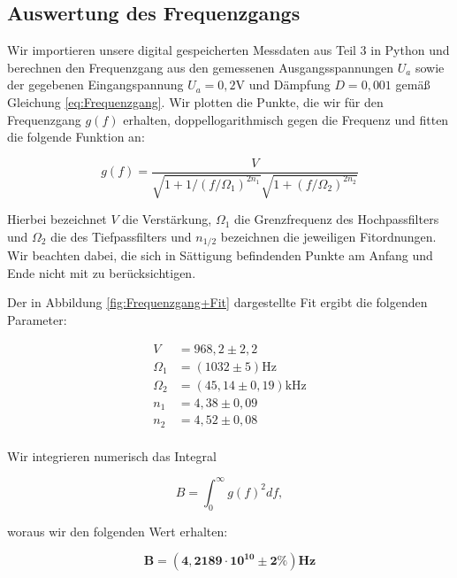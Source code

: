 \documentclass{article}
\begin{document}
\subsection{Auswertung des Frequenzgangs}

Wir importieren unsere digital gespeicherten Messdaten aus Teil 3 in Python und berechnen den Frequenzgang aus den gemessenen Ausgangsspannungen $U_a$ sowie der gegebenen Eingangspannung $U_a = 0,2$V und Dämpfung $D= 0,001$ gemäß Gleichung \ref{eq:Frequenzgang}. Wir plotten die Punkte, die wir für den Frequenzgang $g(f)$ erhalten, doppellogarithmisch gegen die Frequenz und fitten die folgende Funktion an:

\begin{equation}
    g(f) = \frac{V}{\sqrt{1 + 1 /(f / \Omega_1)^{2n_1}} \sqrt{1 + (f/ \Omega_2)^{2n_2}}}
\end{equation}

Hierbei bezeichnet $V$ die Verstärkung, $\Omega_{1}$ die Grenzfrequenz des Hochpassfilters und $\Omega_2$ die des Tiefpassfilters und $n_{1/2}$ bezeichnen die jeweiligen Fitordnungen. Wir beachten dabei, die sich in Sättigung befindenden Punkte am Anfang und Ende nicht mit zu berücksichtigen.

Der in Abbildung \ref{fig:Frequenzgang+Fit} dargestellte Fit ergibt die folgenden Parameter:

\begin{equation}
    \begin{split}
        V &= 968,2 \pm 2,2 \\
        \Omega_1 &= (1032 \pm 5) \text{Hz} \\
        \Omega_2 &= (45,14 \pm 0,19) \text{kHz} \\
        n_1 &= 4,38 \pm 0,09 \\
        n_2 &= 4,52 \pm 0,08 \\
    \end{split}
\end{equation}

Wir integrieren numerisch das Integral 

\begin{equation}
    B = \int_{0}^{\infty} g(f)^2 df,
\end{equation}

woraus wir den folgenden Wert erhalten:

\begin{equation}
    \bm{B = (4,2189 \cdot 10^{10} \pm 2\%)Hz}
\end{equation}
\end{document}
